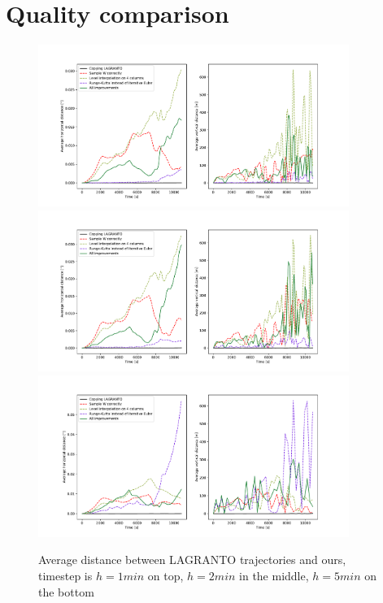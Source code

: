 

\section{Quality comparison}

\begin{figure}
\centering \includegraphics*[width=0.9\textwidth]{figures/plot_dt1}
\label{fig:plot_dt1}
\centering \includegraphics*[width=0.9\textwidth]{figures/plot_dt2}
\label{fig:plot_dt2}
\centering \includegraphics*[width=0.9\textwidth]{figures/plot_dt5}
\caption{Average distance between LAGRANTO trajectories and ours, timestep is $h = 1 min$ on top, $h = 2 min$ in the middle, $h = 5 min$ on the bottom}
\label{fig:plot_dt5}
\end{figure}

